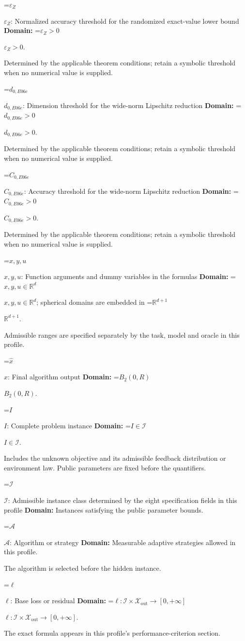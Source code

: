 \documentclass[10pt,a4paper]{article}
\newcommand{\AtlasMath}[1]{\par\begingroup\centering\setbox0=\hbox{$\displaystyle #1$}\ifdim\wd0>1.4\linewidth\typeout{ATLAS WIDE FORMULA: \the\wd0}\fi\ifdim\wd0>\linewidth\resizebox{\linewidth}{!}{\box0}\else\box0\fi\par\endgroup}
\newcommand{\AtlasInlineMath}[1]{\begingroup\setbox0=\hbox{$#1$}\ifdim\wd0>.4\linewidth\endgroup\AtlasMath{#1}\else\endgroup$#1$\fi}
\begin{document}
\AtlasInlineMath{\varepsilon_Z}: Normalized accuracy threshold for the randomized exact-value lower bound \textbf{Domain:} \AtlasInlineMath{\varepsilon_Z>0}.

Determined by the applicable theorem conditions; retain a symbolic threshold when no numerical value is supplied.

\AtlasInlineMath{d_{0,E06e}}: Dimension threshold for the wide-norm Lipschitz reduction \textbf{Domain:} \AtlasInlineMath{d_{0,E06e}>0}.

Determined by the applicable theorem conditions; retain a symbolic threshold when no numerical value is supplied.

\AtlasInlineMath{C_{0,E06e}}: Accuracy threshold for the wide-norm Lipschitz reduction \textbf{Domain:} \AtlasInlineMath{C_{0,E06e}>0}.

Determined by the applicable theorem conditions; retain a symbolic threshold when no numerical value is supplied.

\AtlasInlineMath{x,y,u}: Function arguments and dummy variables in the formulas \textbf{Domain:} \AtlasInlineMath{x,y,u\in\mathbb{R}^d}; spherical domains are embedded in \AtlasInlineMath{\mathbb{R}^{d+1}}.

Admissible ranges are specified separately by the task, model and oracle in this profile.

\AtlasInlineMath{\widehat{x}}: Final algorithm output \textbf{Domain:} \AtlasInlineMath{B_2(0,R)}.

\AtlasInlineMath{I}: Complete problem instance \textbf{Domain:} \AtlasInlineMath{I\in\mathcal{I}}.

Includes the unknown objective and its admissible feedback distribution or environment law. Public parameters are fixed before the quantifiers.

\AtlasInlineMath{\mathcal{I}}: Admissible instance class determined by the eight specification fields in this profile \textbf{Domain:} Instances satisfying the public parameter bounds.

\AtlasInlineMath{\mathcal{A}}: Algorithm or strategy \textbf{Domain:} Measurable adaptive strategies allowed in this profile.

The algorithm is selected before the hidden instance.

\AtlasInlineMath{\ell}: Base loss or residual \textbf{Domain:} \AtlasInlineMath{\ell:\mathcal{I}\times\mathcal{X}_{\mathrm{out}}\to[0,+\infty]}.

The exact formula appears in this profile's performance-criterion section.
\end{document}

